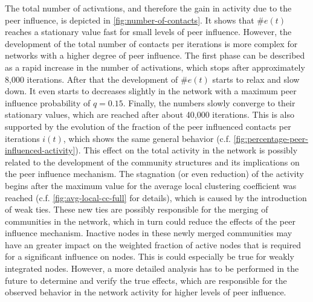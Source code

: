 The total number of activations, and therefore the gain in activity due to the peer influence, is depicted in \cref{fig:number-of-contacts}.
It shows that \( \#e(t) \) reaches a stationary value fast for small levels of peer influence.
However, the development of the total number of contacts per iterations is more complex for networks with a higher degree of peer influence.
The first phase can be described as a rapid increase in the number of activations, which stops after approximately 8,000 iterations.
After that the development of \( \#e(t) \) starts to relax and slow down.
It even starts to decreases slightly in the network with a maximum peer influence probability of \( q = 0.15 \).
Finally, the numbers slowly converge to their stationary values, which are reached after about 40,000 iterations.
This is also supported by the evolution of the fraction of the peer influenced contacts per iterations \( i(t) \), which shows the same general behavior (c.f. \cref{fig:percentage-peer-influenced-activity}).
This effect on the total activity in the network is possibly related to the development of the community structures and its implications on the peer influence mechanism.
The stagnation (or even reduction) of the activity begins after the maximum value for the average local clustering coefficient was reached (c.f. \cref{fig:avg-local-cc-full} for details), which is caused by the introduction of weak ties.
These new ties are possibly responsible for the merging of communities in the network, which in turn could reduce the effects of the peer influence mechanism.
Inactive nodes in these newly merged communities may have an greater impact on the weighted fraction of active nodes that is required for a significant influence on nodes.
This is could especially be true for weakly integrated nodes.
However, a more detailed analysis has to be performed in the future to determine and verify the true effects, which are responsible for the observed behavior in the network activity for higher levels of peer influence. 



